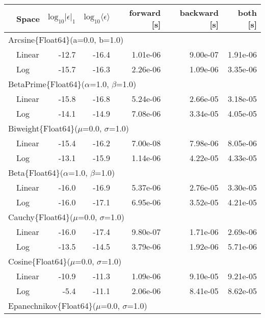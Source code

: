 \begin{tabular}{|llrrrrr|} \hline
& Space & $\mbox{log}_{10}|\epsilon|_1$ & $\mbox{log}_{10}\langle\epsilon\rangle$ & forward [s] & backward [s] & both [s]\\ \hline
\multicolumn{7}{|l|}{Arcsine\{Float64\}(a=0.0, b=1.0)}\\ \hline
& Linear & -12.7 & {\color{blue}-16.4} & {\color{blue}1.01e-06} & {\color{blue}9.00e-07} & {\color{blue}1.91e-06}\\
& Log & {\color{blue}-15.7} & -16.3 & 2.26e-06 & 1.09e-06 & 3.35e-06\\
\hline
\multicolumn{7}{|l|}{BetaPrime\{Float64\}($\alpha$=1.0, $\beta$=1.0)}\\ \hline
& Linear & {\color{blue}-15.8} & {\color{blue}-16.8} & {\color{blue}5.24e-06} & {\color{blue}2.66e-05} & {\color{blue}3.18e-05}\\
& Log & -14.1 & -14.9 & 7.08e-06 & 3.34e-05 & 4.05e-05\\
\hline
\multicolumn{7}{|l|}{Biweight\{Float64\}($\mu$=0.0, $\sigma$=1.0)}\\ \hline
& Linear & {\color{blue}-15.4} & {\color{blue}-16.2} & {\color{blue}7.00e-08} & {\color{blue}7.98e-06} & {\color{blue}8.05e-06}\\
& Log & -13.1 & -15.9 & 1.14e-06 & 4.22e-05 & 4.33e-05\\
\hline
\multicolumn{7}{|l|}{Beta\{Float64\}($\alpha$=1.0, $\beta$=1.0)}\\ \hline
& Linear & -16.0 & -16.9 & {\color{blue}5.37e-06} & {\color{blue}2.76e-05} & {\color{blue}3.30e-05}\\
& Log & {\color{blue}-16.0} & {\color{blue}-17.1} & 6.95e-06 & 3.52e-05 & 4.21e-05\\
\hline
\multicolumn{7}{|l|}{Cauchy\{Float64\}($\mu$=0.0, $\sigma$=1.0)}\\ \hline
& Linear & {\color{blue}-16.0} & {\color{blue}-17.4} & {\color{blue}9.80e-07} & {\color{blue}1.71e-06} & {\color{blue}2.69e-06}\\
& Log & -13.5 & -14.5 & 3.79e-06 & 1.92e-06 & 5.71e-06\\
\hline
\multicolumn{7}{|l|}{Cosine\{Float64\}($\mu$=0.0, $\sigma$=1.0)}\\ \hline
& Linear & {\color{blue}-10.9} & {\color{blue}-11.3} & {\color{blue}1.09e-06} & 9.10e-05 & 9.21e-05\\
& Log & -5.4 & -11.1 & 2.06e-06 & {\color{blue}8.41e-05} & {\color{blue}8.62e-05}\\
\hline
\multicolumn{7}{|l|}{Epanechnikov\{Float64\}($\mu$=0.0, $\sigma$=1.0)}\\ \hline

\end{tabular}
